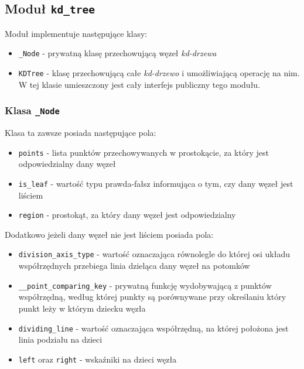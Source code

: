 \documentclass{article}
\begin{document}
\subsection{Moduł \texttt{kd\_tree}}

Moduł implementuje następujące klasy:
\begin{itemize}
    \item \texttt{\_Node} - prywatną klasę przechowującą węzeł \textit{kd-drzewa}
    \item \texttt{KDTree} - klasę przechowującą całe \textit{kd-drzewo} i umożliwiającą operację na nim. W tej klasie umieszczony jest cały interfejs publiczny tego modułu.
\end{itemize}

\subsubsection{Klasa \texttt{\_Node}}

Klasa ta zawsze posiada następujące pola:
\begin{itemize}
    \item \texttt{points} - lista punktów przechowywanych w prostokącie, za który jest odpowiedzialny dany węzeł
    \item \texttt{is\_leaf} - wartość typu prawda-fałsz informująca o tym, czy dany węzeł jest liściem
    \item \texttt{region} - prostokąt, za który dany węzeł jest odpowiedzialny
\end{itemize}

Dodatkowo jeżeli dany węzeł nie jest liściem posiada pola:
\begin{itemize}
    \item \texttt{division\_axis\_type} - wartość oznaczająca równolegle do której osi układu współrzędnych przebiega linia dzieląca dany węzeł na potomków
    \item \texttt{\_\_point\_comparing\_key} - prywatną funkcję wydobywającą z punktów współrzędną, według której punkty są porównywane przy określaniu który punkt leży w którym dziecku węzła
    \item \texttt{dividing\_line} - wartość oznaczająca współrzędną, na której położona jest linia podziału na dzieci
    \item \texttt{left} oraz \texttt{right} - wskaźniki na dzieci węzła
\end{itemize}
\end{document}
